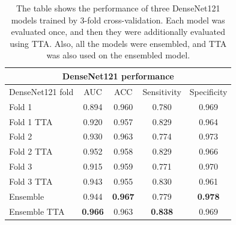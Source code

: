 \documentclass[thesis=B,english]{FITthesis}[2019/12/23]
\begin{document}
\begin{table}[h]
    \centering
        \begin{tabular}{ |p{3cm}||c|c|c|c|  }
         \hline
         \multicolumn{5}{|c|}{DenseNet121 performance} \\
         \hline
         \hline
         DenseNet121 fold & AUC & ACC & Sensitivity & Specificity\\
         \hline
         Fold 1       & 0.894 & 0.960 & 0.780 & 0.969\\
         Fold 1 TTA   & 0.920 & 0.957 & 0.829 & 0.964\\
         Fold 2       & 0.930 & 0.963 & 0.774 & 0.973\\
         Fold 2 TTA   & 0.952 & 0.958 & 0.829 & 0.966\\
         Fold 3       & 0.915 & 0.959 & 0.771 & 0.970\\
         Fold 3 TTA   & 0.943 & 0.955 & 0.830 & 0.961\\
         Ensemble     & 0.944 & \textbf{0.967} & 0.779 & \textbf{0.978}\\
         Ensemble TTA & \textbf{0.966} & 0.963 & \textbf{0.838} & 0.969\\
         \hline
        \end{tabular}
    \caption{The table shows the performance of three DenseNet121 models trained by 3-fold cross-validation. Each model was evaluated once, and then they were additionally evaluated using TTA. Also, all the models were ensembled, and TTA was also used on the ensembled model.}
    \label{tab:DenseNet_performance}
\end{table}
\end{document}

